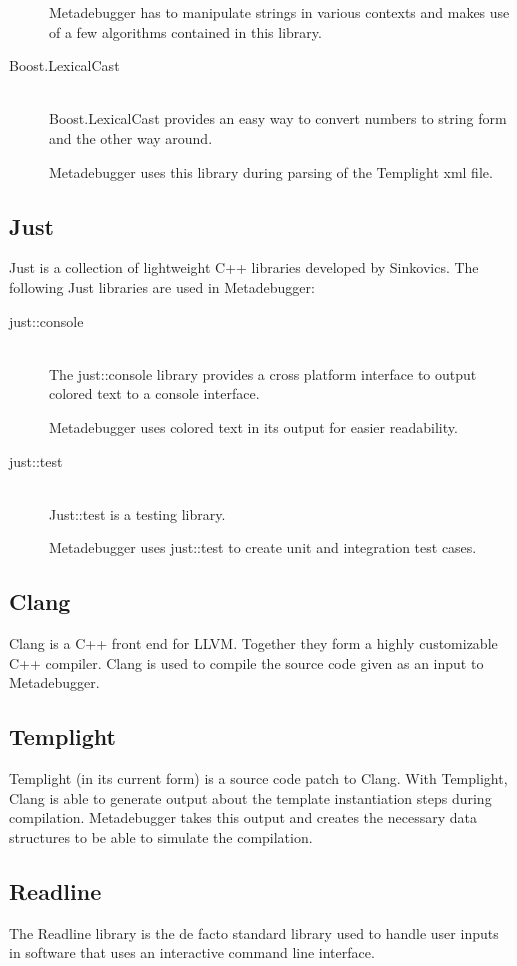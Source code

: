 \begin{description}
        Metadebugger has to manipulate strings in various contexts and makes
        use of a few algorithms contained in this library.
    \item[Boost.LexicalCast]\cite{boost-lexicalcast} \hfill \\
        Boost.LexicalCast provides an easy way to convert numbers to string
        form and the other way around.

        Metadebugger uses this library during parsing of the Templight xml
        file.

\end{description}

\subsection{Just\cite{just}}

Just is a collection of lightweight C++ libraries developed by Sinkovics. The
following Just libraries are used in Metadebugger:
\begin{description}
    \item[just::console] \hfill \\
        The just::console library provides a cross platform interface to output
        colored text to a console interface.

        Metadebugger uses colored text in its output for easier readability.
    \item[just::test] \hfill \\
        Just::test is a testing library.

        Metadebugger uses just::test to create unit and integration test cases.
\end{description}

\subsection{Clang\cite{clang,libclang}}

Clang is a C++ front end for LLVM. Together they form a highly customizable C++
compiler. Clang is used to compile the source code given as an input to
Metadebugger.

\subsection{Templight\cite{templight}}

Templight (in its current form) is a source code patch to Clang. With
Templight, Clang is able to generate output about the template instantiation
steps during compilation. Metadebugger takes this output and creates the
necessary data structures to be able to simulate the compilation.

\subsection{Readline\cite{readline}}

The Readline library is the de facto standard library used to handle user
inputs in software that uses an interactive command line interface.

